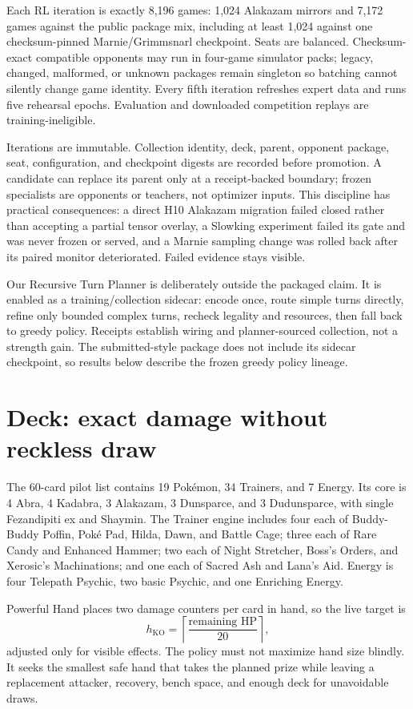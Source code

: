\documentclass[10pt]{article}
\begin{document}
Each RL iteration is exactly 8,196 games: 1,024 Alakazam mirrors and 7,172 games against the public package mix, including at least 1,024 against one checksum-pinned Marnie/Grimmsnarl checkpoint. Seats are balanced. Checksum-exact compatible opponents may run in four-game simulator packs; legacy, changed, malformed, or unknown packages remain singleton so batching cannot silently change game identity. Every fifth iteration refreshes expert data and runs five rehearsal epochs. Evaluation and downloaded competition replays are training-ineligible.

Iterations are immutable. Collection identity, deck, parent, opponent package, seat, configuration, and checkpoint digests are recorded before promotion. A candidate can replace its parent only at a receipt-backed boundary; frozen specialists are opponents or teachers, not optimizer inputs. This discipline has practical consequences: a direct H10 Alakazam migration failed closed rather than accepting a partial tensor overlay, a Slowking experiment failed its gate and was never frozen or served, and a Marnie sampling change was rolled back after its paired monitor deteriorated. Failed evidence stays visible.

Our Recursive Turn Planner is deliberately outside the packaged claim. It is enabled as a training/collection sidecar: encode once, route simple turns directly, refine only bounded complex turns, recheck legality and resources, then fall back to greedy policy. Receipts establish wiring and planner-sourced collection, not a strength gain. The submitted-style package does not include its sidecar checkpoint, so results below describe the frozen greedy policy lineage.

\section*{Deck: exact damage without reckless draw}

The 60-card pilot list contains 19 Pok\'emon, 34 Trainers, and 7 Energy. Its core is 4 Abra, 4 Kadabra, 3 Alakazam, 3 Dunsparce, and 3 Dudunsparce, with single Fezandipiti ex and Shaymin. The Trainer engine includes four each of Buddy-Buddy Poffin, Pok\'e Pad, Hilda, Dawn, and Battle Cage; three each of Rare Candy and Enhanced Hammer; two each of Night Stretcher, Boss's Orders, and Xerosic's Machinations; and one each of Sacred Ash and Lana's Aid. Energy is four Telepath Psychic, two basic Psychic, and one Enriching Energy.

Powerful Hand places two damage counters per card in hand, so the live target is
\[
  h_{\mathrm{KO}}=\left\lceil\frac{\text{remaining HP}}{20}\right\rceil,
\]
adjusted only for visible effects. The policy must not maximize hand size blindly. It seeks the smallest safe hand that takes the planned prize while leaving a replacement attacker, recovery, bench space, and enough deck for unavoidable draws.
\end{document}
